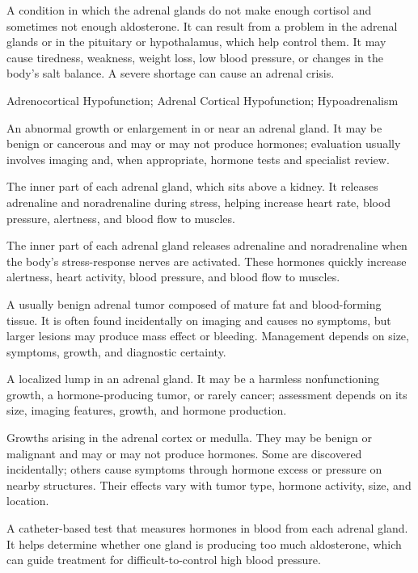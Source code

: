  A condition in which the adrenal glands do not make enough cortisol and sometimes not enough aldosterone. It can result from a problem in the adrenal glands or in the pituitary or hypothalamus, which help control them. It may cause tiredness, weakness, weight loss, low blood pressure, or changes in the body's salt balance. A severe shortage can cause an adrenal crisis.

\synonyms
Adrenocortical Hypofunction; Adrenal Cortical Hypofunction; Hypoadrenalism

 An abnormal growth or enlargement in or near an adrenal gland. It may be benign or cancerous and may or may not produce hormones; evaluation usually involves imaging and, when appropriate, hormone tests and specialist review.

 The inner part of each adrenal gland, which sits above a kidney. It releases adrenaline and noradrenaline during stress, helping increase heart rate, blood pressure, alertness, and blood flow to muscles.

 The inner part of each adrenal gland releases adrenaline and noradrenaline when the body’s stress-response nerves are activated. These hormones quickly increase alertness, heart activity, blood pressure, and blood flow to muscles.

 A usually benign adrenal tumor composed of mature fat and blood-forming tissue. It is often
found incidentally on imaging and causes no symptoms, but larger lesions may produce mass
effect or bleeding. Management depends on size, symptoms, growth, and diagnostic
certainty.

 A localized lump in an adrenal gland. It may be a harmless nonfunctioning growth, a hormone-producing tumor, or rarely cancer; assessment depends on its size, imaging features, growth, and hormone production.

 Growths arising in the adrenal cortex or medulla. They may be
benign or malignant and may or may not produce hormones. Some are discovered incidentally;
others cause symptoms through hormone excess or pressure on nearby structures. Their effects
vary with tumor type, hormone activity, size, and location.

 A catheter-based test that measures hormones in blood from each adrenal gland. It helps determine whether one gland is producing too much aldosterone, which can guide treatment for difficult-to-control high blood pressure.

